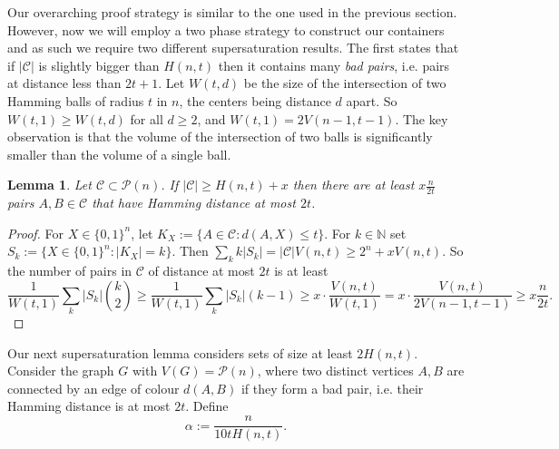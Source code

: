 \documentclass[11pt]{article}
\newtheorem{lemma}[theorem]{Lemma}
\numberwithin{equation}{section}
\begin{document}
Our overarching proof strategy is similar to the one used in the previous section. However, now we will employ a two phase strategy to construct our containers and as such we require two different supersaturation results. 
The first states that if $|\mathcal{C}|$ is slightly bigger than $H(n,t)$ then it contains many \emph{bad pairs}, i.e. pairs at distance less than $2t+1$. 
Let $W(t,d)$ be the size of the intersection of two Hamming balls of radius $t$ in $n$, the centers being distance $d$ apart. So $W(t,1)\geq W(t,d)$ for all $d\geq 2$, and $W(t,1) = 2V(n-1,t-1)$. 
 The key observation is that the volume of the intersection of two balls is significantly smaller than the volume of a single ball.

\begin{lemma}\label{supersatforhammingcodes}
Let $\mathcal{C}\subset \mathcal{P}(n)$. If $|\mathcal{C}|\geq H(n,t)+x$ then there are at least $x\frac{n}{2t}$ pairs $A,B\in\mathcal{C}$ that have Hamming distance at most $2t$.
\end{lemma}
\begin{proof}
For $X\in \{0,1\}^n$, let $K_X:=\{A\in\mathcal{C}:d(A,X)\leq t\}$. For $k\in\mathbb N$ set $S_k:=\{X\in \{0,1\}^n : |K_X|=k \}$. Then $\sum_k k|S_k|=|\mathcal{C}|V(n,t)\geq 2^n + x V(n,t)$. So the number of pairs in $\mathcal{C}$ of distance at most $2t$ is at least $$ \frac{1}{W(t,1)}\sum_k |S_k|\binom{k}{2}\geq \frac{1}{W(t,1)}\sum_k |S_k|(k-1) \geq x\cdot\frac{V(n,t)}{W(t,1)}= x\cdot \frac{V(n,t)}{2V(n-1,t-1)}\geq x \frac{n}{2t}.$$
\end{proof}
Our next supersaturation lemma considers sets of size at least $2H(n,t)$. Consider the graph $G$ with $V(G)=\mathcal{P}(n)$, where two distinct vertices $A,B$ are connected by an edge of colour $d(A,B)$ if they form a bad pair, i.e. their Hamming distance is at most $2t$. Define $$\alpha :=\frac{n}{10tH(n,t)}.$$
\end{document}
